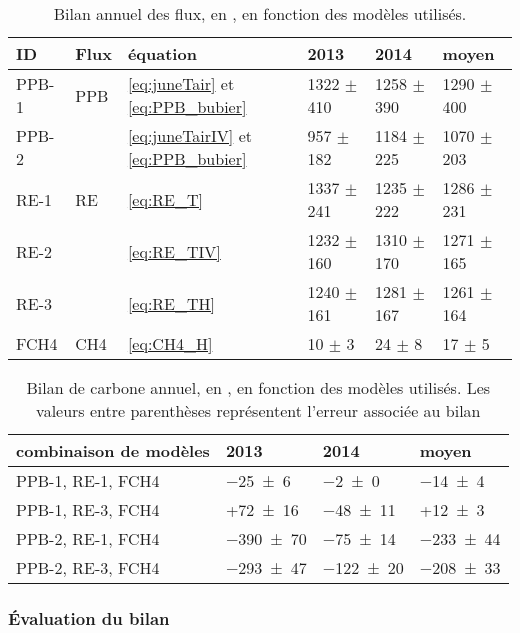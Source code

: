 \begin{table}
\centering
\caption{Bilan annuel des flux, en \si{\gcma}, en fonction des modèles utilisés.}
\label{table:flux}
\begin{tabular}{llllll}\toprule
ID & Flux & équation & 2013 & 2014 & moyen \\ \midrule
PPB-1 & PPB & \ref{eq:juneTair} et \ref{eq:PPB_bubier} & 1322 $\pm$ 410 & 1258 $\pm$ 390 & 1290 $\pm$ 400 \\
PPB-2 & & \ref{eq:juneTairIV} et \ref{eq:PPB_bubier} & 957 $\pm$ 182 & 1184 $\pm$ 225 & 1070 $\pm$ 203 \\[+1.5ex]
RE-1 & RE & \ref{eq:RE_T} & 1337 $\pm$ 241 & 1235 $\pm$ 222 & 1286 $\pm$ 231 \\
RE-2 & & \ref{eq:RE_TIV} & 1232 $\pm$ 160 & 1310 $\pm$ 170 & 1271 $\pm$ 165\\
RE-3 & & \ref{eq:RE_TH} & 1240 $\pm$ 161 & 1281 $\pm$ 167 & 1261 $\pm$ 164 \\[+1.5ex]
FCH4 & CH4 & \ref{eq:CH4_H} & 10 $\pm$ 3 & 24 $\pm$ 8 & 17 $\pm$ 5 \\
\bottomrule
\end{tabular}
\end{table}


\begin{table}
\centering
\caption{Bilan de carbone annuel, en \si{\gcma}, en fonction des modèles utilisés. Les valeurs entre parenthèses représentent l'erreur associée au bilan}
\label{table:bdc}
\begin{tabular}{llll}\toprule
combinaison de modèles & 2013 & 2014 & moyen \\ \midrule
PPB-1, RE-1, FCH4 &  \num{-25(6)} & \num{-2(0)} & \num{-14(4)} \\
PPB-1, RE-3, FCH4 &  +\num{72(16)} & \num{-48(11)} & +\num{12(3)} \\
PPB-2, RE-1, FCH4 &  \num{-390(70)} & \num{-75(14)} & \num{-233(44)} \\
PPB-2, RE-3, FCH4 &  \num{-293(47)} & \num{-122(20)} & \num{-208(33)} \\
\bottomrule
\end{tabular}
\end{table}


\subsubsection{Évaluation du bilan}

